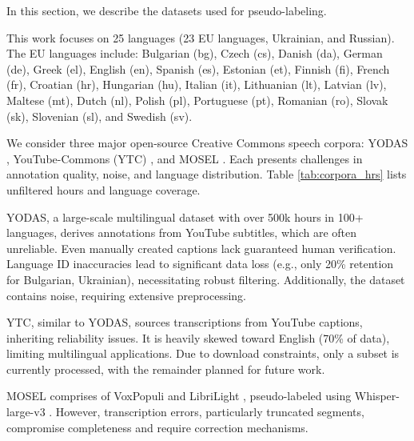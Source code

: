 \label{sec:data}
In this section, we describe the datasets used for pseudo-labeling.
\sloppy

This work focuses on 25 languages (23 EU languages, Ukrainian, and Russian). The EU languages include: Bulgarian (bg), Czech (cs), Danish (da), German (de), Greek (el), English (en), Spanish (es), Estonian (et), Finnish (fi), French (fr), Croatian (hr), Hungarian (hu), Italian (it), Lithuanian (lt), Latvian (lv), Maltese (mt), Dutch (nl), Polish (pl), Portuguese (pt), Romanian (ro), Slovak (sk), Slovenian (sl), and Swedish (sv).

We consider three major open-source Creative Commons speech corpora: YODAS \cite{li2024yodasyoutubeorienteddatasetaudio}, YouTube-Commons (YTC) \cite{pleias2025youtube}, and MOSEL \cite{mosel}. Each presents challenges in annotation quality, noise, and language distribution. Table \ref{tab:corpora_hrs} lists unfiltered hours and language coverage.

YODAS\cite{li2024yodasyoutubeorienteddatasetaudio}, a large-scale multilingual dataset with over 500k hours in 100+ languages, derives annotations from YouTube subtitles, which are often unreliable. Even manually created captions lack guaranteed human verification. Language ID inaccuracies lead to significant data loss (e.g., only 20\% retention for Bulgarian, Ukrainian), necessitating robust filtering. Additionally, the dataset contains noise, requiring extensive preprocessing.

YTC\cite{pleias2025youtube}, similar to YODAS, sources transcriptions from YouTube captions, inheriting reliability issues. It is heavily skewed toward English (70\% of data), limiting multilingual applications. Due to download constraints, only a subset is currently processed, with the remainder planned for future work.

MOSEL\cite{mosel} comprises of VoxPopuli \cite{wang-etal-2021-voxpopuli} and LibriLight \cite{kahn2020libri}, pseudo-labeled using Whisper-large-v3 \cite{radford2023robust}. However, transcription errors, particularly truncated segments, compromise completeness and require correction mechanisms.

\begin{table}[b]
    \centering
    \caption{Language coverage and total number of hours for each Granary corpora before and after filtration pipeline.}
    \label{tab:corpora_hrs}
\end{table}



